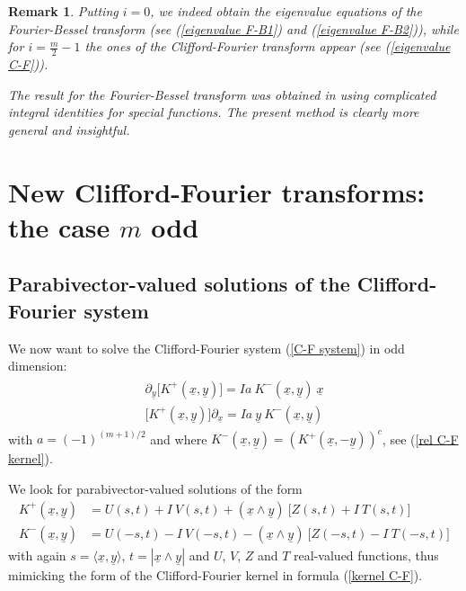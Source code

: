 \documentclass{amsart}
\newtheorem{remark}[theorem]{Remark}
\theoremstyle{remark}
\begin{document}
\begin{remark}
Putting $i=0$, we indeed obtain the eigenvalue equations of the Fourier-Bessel transform (see (\ref{eigenvalue F-B1}) and (\ref{eigenvalue F-B2})), while for $i=\frac{m}{2}-1$ the ones of the Clifford-Fourier transform appear (see (\ref{eigenvalue C-F})).

The result for the Fourier-Bessel transform was obtained in \cite{FourierBessel} using complicated integral identities for special functions. The present method is clearly more general and insightful.
\end{remark}
\section{New Clifford-Fourier transforms: the case $m$ odd}
\setcounter{equation}{0}
\label{Odd}

\subsection{Parabivector-valued solutions of the Clifford-Fourier system}
We now want to solve the Clifford-Fourier system (\ref{C-F system}) in odd dimension:
\begin{align}\label{system2}
\begin{split}
\partial_{\underline{y}} \lbrack K^+({\underline{x}},{\underline{y}}) \rbrack =  I a \ K^-({\underline{x}},{\underline{y}}) \ {\underline{x}}\\
\lbrack K^+({\underline{x}},{\underline{y}}) \rbrack \partial_{\underline{x}}  =  I a \ {\underline{y}} \ K^-({\underline{x}},{\underline{y}})
\end{split}
\end{align}
with $ a=(-1)^{(m+1)/2}$ and where $K^-({\underline{x}},{\underline{y}}) = \left( K^+({\underline{x}},-{\underline{y}}) \right)^c$, see (\ref{rel C-F kernel}).

We look for parabivector-valued solutions of the form
\begin{align*}
K^+({\underline{x}},{\underline{y}})  &=  U(s,t)+ I \  V(s,t) + ({\underline{x}} \wedge {\underline{y}}) \ \lbrack Z(s,t) + I \ T(s,t) \rbrack\\
K^-({\underline{x}},{\underline{y}})  &=  U(-s,t)- I \ V(-s,t) - ({\underline{x}} \wedge {\underline{y}}) \ \lbrack Z(-s,t) - I \ T(-s,t) \rbrack
\end{align*}
with again $s= {{\langle}} {\underline{x}},{\underline{y}} {{\rangle}}$, $t=|{\underline{x}} \wedge {\underline{y}}|$ and $U$, $V$, $Z$ and $T$ real-valued functions, thus mimicking the form of the Clifford-Fourier kernel in formula (\ref{kernel C-F}).
\end{document}
